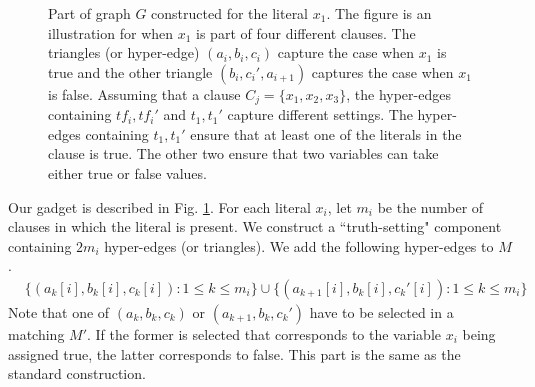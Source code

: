 \documentclass[12pt]{article}
\begin{document}
\begin{figure}[!ht]
  	\caption{Part of graph $G$ constructed for the literal $x_1$. The figure is an illustration for when $x_1$ is part of four different clauses. The triangles (or hyper-edge) $(a_i, b_i, c_i)$ capture the case when $x_1$ is true and the other triangle $(b_i, c_i', a_{i+1})$ captures the case when $x_1$ is false. Assuming that a clause $C_j = \{x_1, x_2, x_3\}$, the hyper-edges containing $tf_i, tf_i'$ and $t_1, t_1'$ capture different settings. The hyper-edges containing $t_1, t_1'$ ensure that at least one of the literals in the clause is true. The other two ensure that two variables can take either true or false values.}
\label{fig:3DMQueries}
\end{figure}

Our gadget is described in Fig. \ref{fig:3DMQueries}. For each literal $x_i$, let $m_i$ be the number of clauses in which the literal is present. We construct a ``truth-setting" component containing $2m_i$ hyper-edges (or triangles). We add the following hyper-edges to $M$.
\begin{align*}
  &\{(a_k[i], b_k[i], c_k[i]): 1 \le k \le m_i\} \cup \{(a_{k+1}[i], b_k[i], c_k'[i]): 1 \le k \le m_i\}
\end{align*}
Note that one of $(a_k, b_k, c_k)$ or $(a_{k+1}, b_k, c_k')$ have to be selected in a matching $M'$. If the former is selected that corresponds to the variable $x_i$ being assigned true, the latter corresponds to false. This part is the same as the standard construction. 
\end{document}
